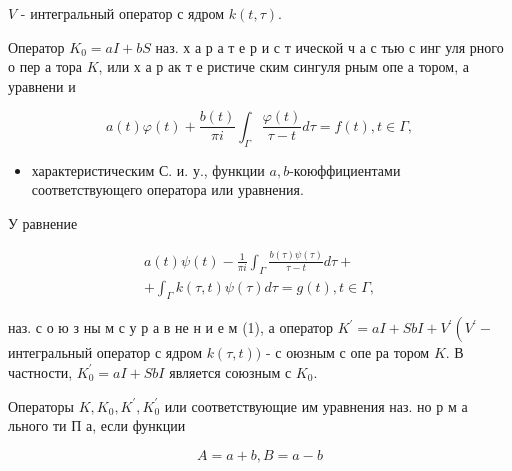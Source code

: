 \documentclass[10pt]{article}
\begin{document}
$V$ - интегральный оператор с ядром $k(t, \tau)$.



Оператор $K_{0}=a I+b S$ наз. х а р а т е р и с т ической ч а с тью с инг уля рного о пер а тора $K$, или х а р ак т е ристиче ским сингуля рным опе а тором, а уравнени и



\[

a(t) \varphi(t)+\frac{b(t)}{\pi i} \int_{\Gamma} \frac{\varphi(t)}{\tau-t} d \tau=f(t), t \in \Gamma,

\]



\begin{itemize}

  \item характеристическим С. и. у., функции $a, b$-коюффициентами соответствующего оператора или уравнения.

\end{itemize}



У равнение



\[

\begin{gathered}

a(t) \psi(t)-\frac{1}{\pi i} \int_{\Gamma} \frac{b(\tau) \psi(\tau)}{\tau-t} d \tau+ \\

+\int_{\Gamma} k(\tau, t) \psi(\tau) d \tau=g(t), t \in \Gamma,

\end{gathered}

\]



наз. с о ю з ны м с у р а в не н и е м (1), а оператор $K^{\prime}=a I+S b I+V^{\prime}\left(V^{\prime}-\right.$ интегральный оператор с ядром $k(\tau, t))$ - с оюзным с опе ра тором $K$. В частности, $K_{0}^{\prime}=a I+S b I$ является союзным с $K_{0}$.



Операторы $K, K_{0}, K^{\prime}, K_{0}^{\prime}$ или соответствующие им уравнения наз. но р м а льного ти П а, если функции



\[

A=a+b, B=a-b

\]
\end{document}
